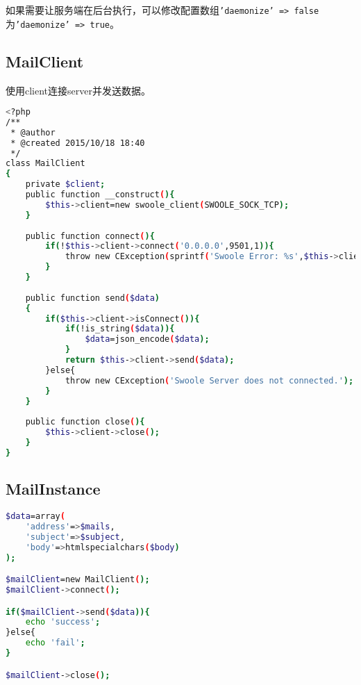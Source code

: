 如果需要让服务端在后台执行，可以修改配置数组\texttt{'daemonize' => false}为\texttt{'daemonize' => true}。


\subsection{MailClient}

使用client连接server并发送数据。




\begin{lstlisting}[language=bash]
<?php
/**
 * @author
 * @created 2015/10/18 18:40
 */
class MailClient
{
	private $client;
	public function __construct(){
		$this->client=new swoole_client(SWOOLE_SOCK_TCP);
	}
	
	public function connect(){
		if(!$this->client->connect('0.0.0.0',9501,1)){
			throw new CException(sprintf('Swoole Error: %s',$this->client->errCode));
		}
	}
	
	public function send($data)
	{
		if($this->client->isConnect()){
			if(!is_string($data)){
				$data=json_encode($data);
			}
			return $this->client->send($data);
		}else{
			throw new CException('Swoole Server does not connected.');
		}
	}
	
	public function close(){
		$this->client->close();
	}
}
\end{lstlisting}


\subsection{MailInstance}


\begin{lstlisting}[language=bash]
$data=array(
	'address'=>$mails,
	'subject'=>$subject,
	'body'=>htmlspecialchars($body)
);

$mailClient=new MailClient();
$mailClient->connect();

if($mailClient->send($data)){
	echo 'success';
}else{
	echo 'fail';
}

$mailClient->close();
\end{lstlisting}





\begin{lstlisting}[language=bash]

\end{lstlisting}




\begin{lstlisting}[language=bash]

\end{lstlisting}



